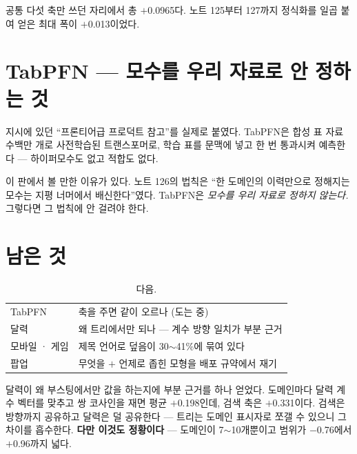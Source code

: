 \documentclass[10pt]{article}
\begin{document}
공통 다섯 축만 쓰던 자리에서 총 $+$0.0965다. 노트 125부터 127까지 정식화를
일곱 붙여 얻은 최대 폭이 $+$0.013이었다.

\section{TabPFN --- 모수를 우리 자료로 안 정하는 것}

지시에 있던 ``프론티어급 프로덕트 참고''를 실제로 붙였다. TabPFN은 합성
표 자료 수백만 개로 사전학습된 트랜스포머로, 학습 표를 문맥에 넣고 한 번
통과시켜 예측한다 --- 하이퍼모수도 없고 적합도 없다.

이 판에서 볼 만한 이유가 있다. 노트 126의 법칙은 ``한 도메인의 이력만으로
정해지는 모수는 지평 너머에서 배신한다''였다. TabPFN은 \emph{모수를 우리
자료로 정하지 않는다.} 그렇다면 그 법칙에 안 걸려야 한다.


\section{남은 것}

\begin{table}[t]
\centering\tsize
\caption{다음.}
\begin{tabular}{ll}
\toprule
TabPFN & 축을 주면 같이 오르나 (도는 중) \\
달력 & 왜 트리에서만 되나 --- 계수 방향 일치가 부분 근거 \\
모바일 · 게임 & 제목 언어로 덮음이 30$\sim$41\%에 묶여 있다 \\
팝업 & 무엇을 $+$ 언제로 좁힌 모형을 배포 규약에서 재기 \\
\bottomrule
\end{tabular}
\end{table}

달력이 왜 부스팅에서만 값을 하는지에 부분 근거를 하나 얻었다. 도메인마다
달력 계수 벡터를 맞추고 쌍 코사인을 재면 평균 $+$0.198인데, 검색 축은
$+$0.331이다. 검색은 방향까지 공유하고 달력은 덜 공유한다 --- 트리는
도메인 표시자로 쪼갤 수 있으니 그 차이를 흡수한다. \textbf{다만 이것도
정황이다} --- 도메인이 7$\sim$10개뿐이고 범위가 $-$0.76에서 $+$0.96까지
넓다.
\end{document}
